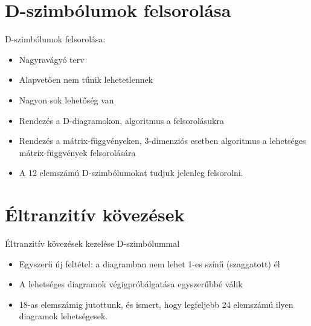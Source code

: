 \section{D-szimbólumok felsorolása}
\begin{frame}
  D-szimbólumok felsorolása:
  \begin{itemize}
    \item Nagyravágyó terv
    \item Alapvetően nem tűnik lehetetlennek
    \item Nagyon sok lehetőség van
    \item Rendezés a D-diagramokon, algoritmus a felsorolásukra
    \item Rendezés a mátrix-függvényeken, $3$-dimenziós esetben algoritmus a
      lehetséges mátrix-függvények felsorolására 
    \item A 12 elemszámú D-szimbólumokat tudjuk jelenleg felsorolni.
  \end{itemize}
\end{frame}

\section{Éltranzitív kövezések}
\begin{frame}
  Éltranzitív kövezések kezelése D-szimbólummal
  \begin{itemize}
    \item Egyszerű új feltétel: a diagramban nem lehet 1-es színű (szaggatott)
      él
    \item A lehetséges diagramok végigpróbálgatása egyszerűbbé válik
    \item 18-as elemszámig jutottunk, és ismert, hogy legfeljebb 24 elemszámú
      ilyen diagramok lehetségesek.
  \end{itemize}
\end{frame}

